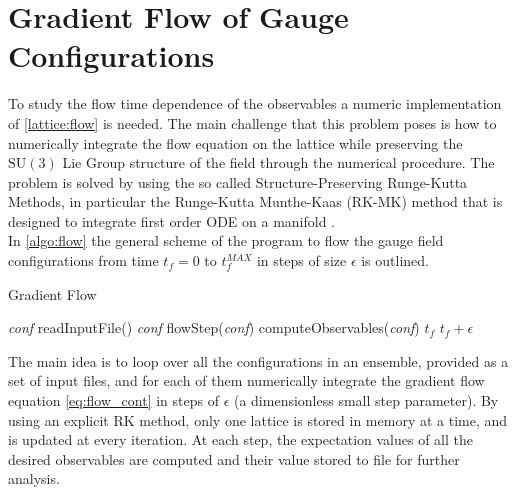 \section{Gradient Flow of Gauge Configurations}
To study the flow time dependence of the observables a numeric implementation of \cref{lattice:flow} is needed. The main challenge that this problem poses is how to numerically integrate the flow equation on the lattice while preserving the $\mathrm{SU}(3)$ Lie Group structure of the field through the numerical procedure. The problem is solved by using the so called Structure-Preserving Runge-Kutta Methods, in particular the Runge-Kutta Munthe-Kaas (RK-MK) method that is designed to integrate first order ODE on a manifold \cite{munthe-kaas_runge-kutta_1998,munthe-kaas_lie-butcher_1995,celledoni_introduction_2014}. \\
In \cref{algo:flow} the general scheme of the program to flow the gauge field configurations from time $t_f=0$ to $t_f^{MAX}$ in steps of size $\epsilon$ is outlined.
\begin{algorithm}[bht!]
    \caption{Gradient Flow}\label{algo:flow}
    \begin{algorithmic}[1]
        \State \textit{conf} \gets readInputFile()     
            \State \textit{conf} \gets flowStep(\textit{conf})
            \State computeObservables(\textit{conf}) 
            \State $t_f$ \gets $t_f + \epsilon$
        \EndFor
    \EndFor
\end{algorithmic}
\end{algorithm}

The main idea is to loop over all the configurations in an ensemble, provided as a set of input files, and for each of them numerically integrate the gradient flow equation \cref{eq:flow_cont} in steps of $\epsilon$ (a dimensionless small step parameter). By using an explicit RK method, only one lattice is stored in memory at a time, and is updated at every iteration. At each step, the expectation values of all the desired observables are computed and their value stored to file for further analysis.

